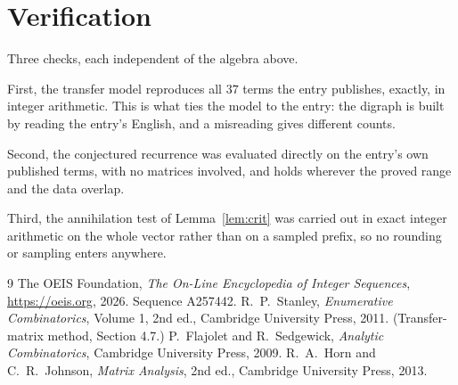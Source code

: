 \documentclass[11pt,a4paper]{article}
\theoremstyle{plain}
\theoremstyle{definition}
\begin{document}
\section{Verification}

Three checks, each independent of the algebra above.

First, the transfer model reproduces all $37$ terms the entry publishes, exactly, in
integer arithmetic. This is what ties the model to the entry: the digraph is built by reading
the entry's English, and a misreading gives different counts.

Second, the conjectured recurrence was evaluated directly on the entry's own published terms,
with no matrices involved, and holds wherever the proved range and the data overlap.

Third, the annihilation test of Lemma~\ref{lem:crit} was carried out in exact integer
arithmetic on the whole vector rather than on a sampled prefix, so no rounding or sampling
enters anywhere.

\begin{thebibliography}{9}
 The OEIS Foundation, \emph{The On-Line Encyclopedia of Integer
Sequences}, \url{https://oeis.org}, 2026. Sequence A257442.
 R.~P.~Stanley, \emph{Enumerative Combinatorics}, Volume 1, 2nd ed.,
Cambridge University Press, 2011. (Transfer-matrix method, Section 4.7.)
 P.~Flajolet and R.~Sedgewick, \emph{Analytic Combinatorics}, Cambridge
University Press, 2009.
 R.~A.~Horn and C.~R.~Johnson, \emph{Matrix Analysis}, 2nd ed., Cambridge
University Press, 2013.
\end{thebibliography}
\end{document}
